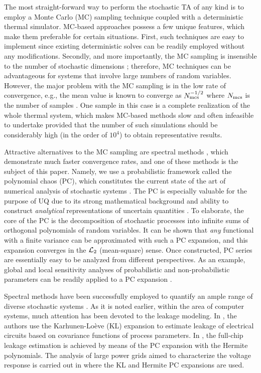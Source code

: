 The most straight-forward way to perform the stochastic TA of any kind is to employ a Monte Carlo (MC) sampling technique coupled with a deterministic thermal simulator. MC-based approaches possess a few unique features, which make them preferable for certain situations. First, such techniques are easy to implement since existing deterministic solves can be readily employed without any modifications. Secondly, and more importantly, the MC sampling is insensible to the number of stochastic dimensions \cite{maitre2010}; therefore, MC techniques can be advantageous for systems that involve large numbers of random variables. However, the major problem with the MC sampling is in the low rate of convergence, e.g., the mean value is known to converge as $N_\text{mcs}^{-{{1}/{2}}}$ where $N_\text{mcs}$ is the number of samples \cite{xiu2009, maitre2010}. One sample in this case is a complete realization of the whole thermal system, which makes MC-based methods slow and often infeasible to undertake provided that the number of such simulations should be considerably high (in the order of $10^4$) to obtain representative results.

Attractive alternatives to the MC sampling are spectral methods \cite{maitre2010}, which demonstrate much faster convergence rates, and one of these methods is the subject of this paper. Namely, we use a probabilistic framework called the polynomial chaos (PC), which constitutes the current state of the art of numerical analysis of stochastic systems \cite{xiu2009}. The PC is especially valuable for the purpose of UQ due to its strong mathematical background and ability to construct \emph{analytical} representations of uncertain quantities \cite{eldred2009}. To elaborate, the core of the PC is the decomposition of stochastic processes into infinite sums of orthogonal polynomials of random variables. It can be shown that \emph{any} functional with a finite variance can be approximated with such a PC expansion, and this expansion converges in the $\mathcal{L}_{2}$ (mean-square) sense. Once constructed, PC series are essentially easy to be analyzed from different perspectives. As an example, global and local sensitivity analyses of probabilistic and non-probabilistic parameters can be readily applied to a PC expansion \cite{eldred2009, maitre2010}.

Spectral methods have been successfully employed to quantify an ample range of diverse stochastic systems \cite{xiu2010}. As it is noted earlier, within the area of computer systems, much attention has been devoted to the leakage modeling. In \cite{bhardwaj2006}, the authors use the Karhunen-Lo\`{e}ve (KL) expansion \cite{loeve1978} to estimate leakage of electrical circuits based on covariance functions of process parameters. In \cite{shen2009}, the full-chip leakage estimation is achieved by means of the PC expansion with the Hermite polynomials. The analysis of large power grids aimed to characterize the voltage response is carried out in \cite{ghanta2006} where the KL and Hermite PC expansions are used.

